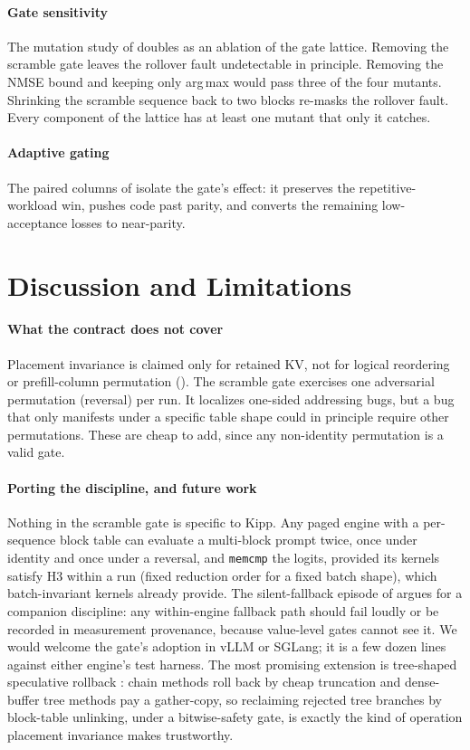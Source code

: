 \documentclass[sigconf,nonacm,screen]{acmart}
\newcommand{\code}[1]{\texttt{\small #1}}
\begin{document}
\paragraph{Gate sensitivity} The mutation study of 
doubles as an ablation of the gate lattice. Removing the scramble gate
leaves the rollover fault undetectable in principle. Removing the NMSE bound
and keeping only arg\,max would pass three of the four mutants. Shrinking
the scramble sequence back to two blocks re-masks the rollover fault. Every
component of the lattice has at least one mutant that only it catches.
\paragraph{Adaptive gating} The paired columns of  isolate
the gate's effect: it preserves the repetitive-workload win, pushes code
past parity, and converts the remaining low-acceptance losses to
near-parity.

\section{Discussion and Limitations}
\label{sec:discussion}

\paragraph{What the contract does not cover} Placement invariance is
claimed only for retained KV, not for logical reordering or prefill-column
permutation (). The scramble gate exercises one adversarial
permutation (reversal) per run. It localizes one-sided addressing bugs, but
a bug that only manifests under a specific table shape could in principle
require other permutations. These are cheap to add, since any non-identity
permutation is a valid gate.

\paragraph{Porting the discipline, and future work} Nothing in the scramble
gate is specific to Kipp. Any paged engine with a per-sequence block table
can evaluate a multi-block prompt twice, once under identity and once under
a reversal, and \code{memcmp} the logits, provided its kernels satisfy H3
within a run (fixed reduction order for a fixed batch shape), which
batch-invariant kernels \citep{he2025defeating} already provide. The
silent-fallback episode of  argues for a companion
discipline: any within-engine fallback path should fail loudly or be
recorded in measurement provenance, because value-level gates cannot see
it. We would
welcome the gate's adoption in vLLM or SGLang; it is a few dozen lines
against either engine's test harness. The most promising extension is
tree-shaped speculative rollback
\citep{cai2024medusa,li2024eagle,li2024eagle2}: chain methods roll back by
cheap truncation and dense-buffer tree methods pay a gather-copy, so
reclaiming rejected tree branches by block-table unlinking, under a
bitwise-safety gate, is exactly the kind of operation placement invariance
makes trustworthy.
\end{document}

